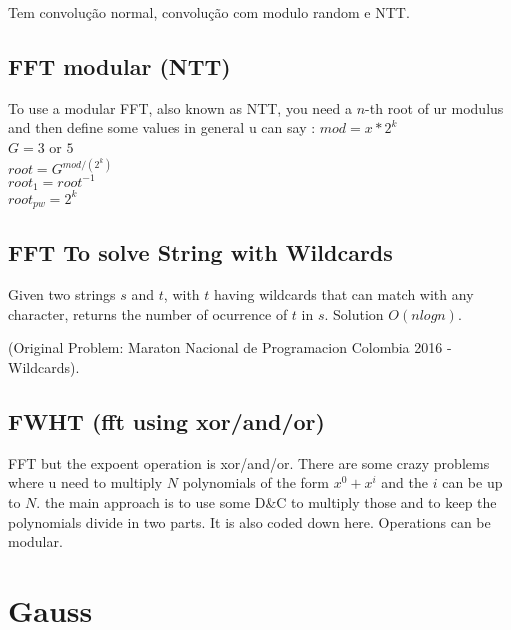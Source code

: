         Tem convolução normal, convolução com modulo random e NTT.
        

        \subsection{FFT modular (NTT)}
        \tab To use a modular FFT, also known as NTT, you need a $n$-th root of ur modulus and then define some values in general u can say :
        $mod = x*2^k$ \\
        $G = 3 $ or $5$ \\
        $root = G^{mod/(2^k)}$ \\
        $root_1 = root^{-1}$ \\
        $root_{pw} = 2^k$
        
        
        \subsection{FFT To solve String with Wildcards}
        \tab Given two strings $s$ and $t$, with $t$ having wildcards that can match with any character, returns the number of ocurrence of $t$ in $s$.
        Solution $O(nlogn)$.
        
        (Original Problem: Maraton Nacional de Programacion Colombia 2016 - Wildcards).
        

        \subsection{FWHT (fft using xor/and/or)}
        \tab FFT but the expoent operation is xor/and/or.
        There are some crazy problems where u need to multiply $N$ polynomials of the form $x^0 + x^i$ and the $i$ can be up to $N$. the main approach is to use some D\&C to multiply those and to keep the polynomials divide in two parts. It is also coded down here. Operations can be modular.
        
    \section{Gauss}
